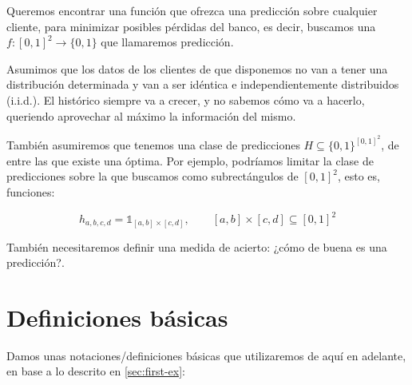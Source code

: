 Queremos encontrar una función que ofrezca una predicción sobre cualquier cliente, para minimizar posibles pérdidas del banco, es
decir, buscamos una $f:[0,1]^2 \rightarrow \{0,1\}$ que llamaremos predicción.

Asumimos que los datos de los clientes de que disponemos no van a tener una distribución determinada y
van a ser idéntica e independientemente distribuidos (i.i.d.). El histórico siempre va a crecer, y no sabemos cómo va a hacerlo, 
queriendo aprovechar al máximo la información del mismo.

También asumiremos que tenemos una clase de predicciones $H \subseteq \{0,1\}^{[0,1]^2}$, de entre las que existe
una óptima. Por ejemplo, podríamos limitar la clase de predicciones sobre la que buscamos como subrectángulos de $[0,1]^2$, 
esto es, funciones:

\[h_{a,b,c,d} = \mathds{1}_{[a,b]\times[c,d]}, \qquad [a,b]\times [c,d] \subseteq [0,1]^2\]


También necesitaremos definir una medida de acierto: ¿cómo de buena es una predicción?.

\section{Definiciones básicas}
\label{sec:defs}

Damos unas notaciones/definiciones básicas que utilizaremos de aquí en adelante, en base a lo descrito en \ref{sec:first-ex}:


